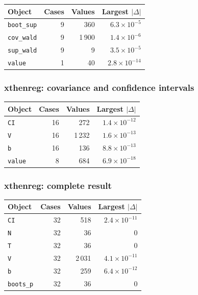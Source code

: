 \documentclass[
  10.5pt,
  a4paper,
]{article}
\begin{document}
\begin{longtable}{@{}p{8.2cm}rrr@{}}
\toprule
Object & Cases & Values & Largest $|\Delta|$ \\
\midrule
\endhead
\texttt{boot\_\allowbreak{}sup} & 9 & 360 & $6.3\times10^{-5}$ \\
\texttt{cov\_\allowbreak{}wald} & 9 & 1\,900 & $1.4\times10^{-6}$ \\
\texttt{sup\_\allowbreak{}wald} & 9 & 9 & $3.5\times10^{-5}$ \\
\texttt{value} & 1 & 40 & $2.8\times10^{-14}$ \\
\bottomrule
\end{longtable}

\subsubsection*{xthenreg: covariance and confidence intervals}

\begin{longtable}{@{}p{8.2cm}rrr@{}}
\toprule
Object & Cases & Values & Largest $|\Delta|$ \\
\midrule
\endhead
\texttt{CI} & 16 & 272 & $1.4\times10^{-12}$ \\
\texttt{V} & 16 & 1\,232 & $1.6\times10^{-13}$ \\
\texttt{b} & 16 & 136 & $8.8\times10^{-13}$ \\
\texttt{value} & 8 & 684 & $6.9\times10^{-18}$ \\
\bottomrule
\end{longtable}

\subsubsection*{xthenreg: complete result}

\begin{longtable}{@{}p{8.2cm}rrr@{}}
\toprule
Object & Cases & Values & Largest $|\Delta|$ \\
\midrule
\endhead
\texttt{CI} & 32 & 518 & $2.4\times10^{-11}$ \\
\texttt{N} & 32 & 36 & 0 \\
\texttt{T} & 32 & 36 & 0 \\
\texttt{V} & 32 & 2\,031 & $4.1\times10^{-11}$ \\
\texttt{b} & 32 & 259 & $6.4\times10^{-12}$ \\
\texttt{boots\_\allowbreak{}p} & 32 & 36 & 0 \\
\bottomrule
\end{longtable}
\end{document}
